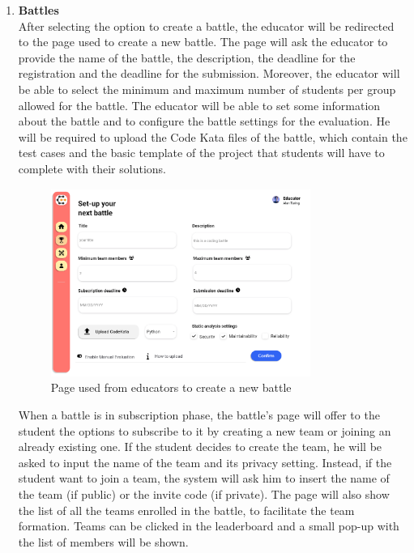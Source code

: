 \begin{enumerate}[label=\textbf{F\arabic*)}]
    \item \textbf{Battles}\\
    After selecting the option to create a battle, the educator will be redirected to the page used to create a new battle. The page will ask the educator to provide the name of the battle, the description, the deadline for the registration and the deadline for the submission. Moreover, the educator will be able to select the minimum and maximum number of students per group allowed for the battle. The educator will be able to set some information about the battle and to configure the battle settings for the evaluation. He will be required to upload the Code Kata files of the battle, which contain the test cases and the basic template of the project that students will have to complete with their solutions.
    \begin{figure}[H]
        \centering
        \includegraphics[width=0.8\textwidth]{Mockups/10_educator_create_battle.png}
        \caption{Page used from educators to create a new battle}
    \end{figure}
    When a battle is in subscription phase, the battle's page will offer to the student the options to subscribe to it by creating a new team or joining an already existing one. If the student decides to create the team, he will be asked to input the name of the team and its privacy setting. Instead, if the student want to join a team, the system will ask him to insert the name of the team (if public) or the invite code (if private). The page will also show the list of all the teams enrolled in the battle, to facilitate the team formation. Teams can be clicked in the leaderboard and a small pop-up with the list of members will be shown.\\
    \begin{figure}[H]

\end{figure}
\end{enumerate}
